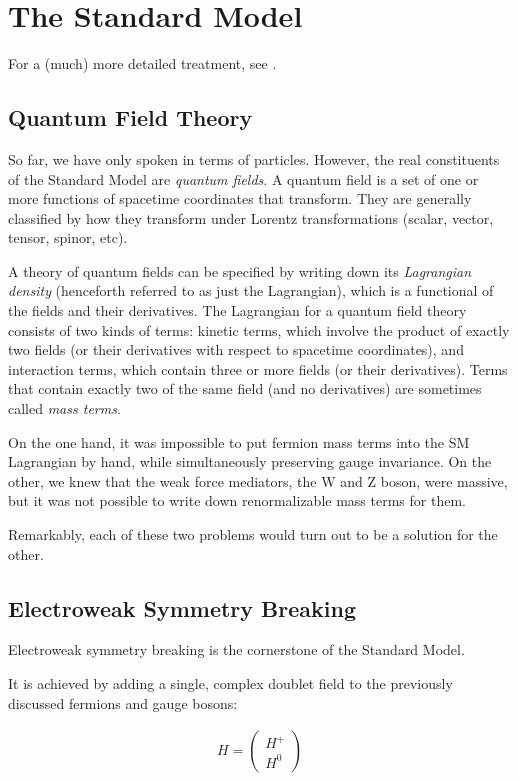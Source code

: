 \chapter{The Standard Model}\label{ch:sm}

For a (much) more detailed treatment, see \citep{Schwartz2014}.
\section{Quantum Field Theory}
So far, we have only spoken in terms of particles. However, the real constituents of the Standard Model are \emph{quantum fields}. A quantum field is a set of one or more functions of spacetime coordinates that transform. They are generally classified by how they transform under Lorentz transformations (scalar, vector, tensor, spinor, etc). 

A theory of quantum fields can be specified by writing down its \emph{Lagrangian density} (henceforth referred to as just the Lagrangian), which is a functional of the fields and their derivatives. The Lagrangian for a quantum field theory consists of two kinds of terms: kinetic terms, which involve the product of exactly two fields (or their derivatives with respect to spacetime coordinates), and interaction terms, which contain three or more fields (or their derivatives). Terms that contain exactly two of the same field (and no derivatives) are sometimes called \emph{mass terms}. 

On the one hand, it was impossible to put fermion mass terms into the SM Lagrangian by hand, while simultaneously preserving gauge invariance. On the other, we knew that the weak force mediators, the W and Z boson, were massive, but it was not possible to write down renormalizable mass terms for them. 

Remarkably, each of these two problems would turn out to be a solution for the other.

\section{Electroweak Symmetry Breaking}

Electroweak symmetry breaking is the cornerstone of the Standard Model. 

It is achieved by adding a single, complex doublet field to the previously discussed fermions and gauge bosons:

\begin{align*}
H = 
\left(
\begin{array}{c}
    H^{+}\\
    H^0
\end{array}
\right)
\end{align*}

